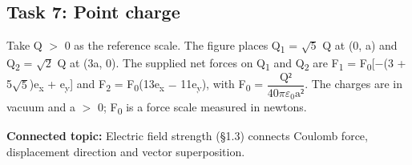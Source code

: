 \documentclass[11pt]{article}
\begin{document}
\begin{keepsection}
\section{Task 7: Point charge}

Take Q \ensuremath{>} 0 as the reference scale. The figure places Q\textsubscript{1} = \ensuremath{\sqrt{5}} Q at (0, a) and Q\textsubscript{2} = \ensuremath{\sqrt{2}} Q at (3a, 0). The supplied net forces on Q\textsubscript{1} and Q\textsubscript{2} are F\textsubscript{1} = F\textsubscript{0}[\ensuremath{-}(3 + 5\ensuremath{\sqrt{5}})e\textsubscript{x} + e\textsubscript{y}] and F\textsubscript{2} = F\textsubscript{0}(13e\textsubscript{x} \ensuremath{-} 11e\textsubscript{y}), with F\textsubscript{0} = {\small\ensuremath{\dfrac{\mathrm{Q}²}{40πε_{0}\mathrm{a}²}}}. The charges are in vacuum and a \ensuremath{>} 0; F\textsubscript{0} is a force scale measured in newtons.

\textbf{Connected topic:} Electric field strength (§1.3) connects Coulomb force, displacement direction and vector superposition.


\end{keepsection}
\end{document}
